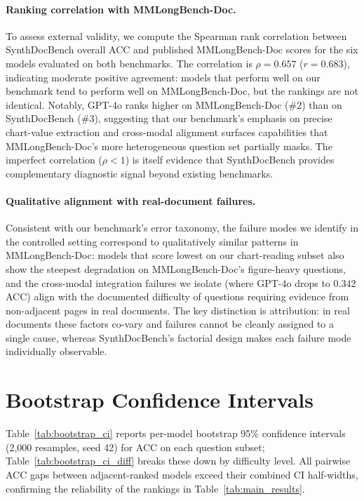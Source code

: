 \documentclass{article} %
\begin{document}
\paragraph{Ranking correlation with MMLongBench-Doc.}
To assess external validity, we compute the Spearman rank correlation between SynthDocBench overall ACC and published MMLongBench-Doc scores for the six models evaluated on both benchmarks. The correlation is $\rho = 0.657$ ($r = 0.683$), indicating moderate positive agreement: models that perform well on our benchmark tend to perform well on MMLongBench-Doc, but the rankings are not identical. Notably, GPT-4o ranks higher on MMLongBench-Doc (\#2) than on SynthDocBench (\#3), suggesting that our benchmark's emphasis on precise chart-value extraction and cross-modal alignment surfaces capabilities that MMLongBench-Doc's more heterogeneous question set partially masks. The imperfect correlation ($\rho < 1$) is itself evidence that SynthDocBench provides complementary diagnostic signal beyond existing benchmarks.

\paragraph{Qualitative alignment with real-document failures.}
Consistent with our benchmark's error taxonomy, the failure modes we identify in the controlled setting correspond to qualitatively similar patterns in MMLongBench-Doc: models that score lowest on our chart-reading subset also show the steepest degradation on MMLongBench-Doc's figure-heavy questions, and the cross-modal integration failures we isolate (where GPT-4o drops to 0.342 ACC) align with the documented difficulty of questions requiring evidence from non-adjacent pages in real documents. The key distinction is attribution: in real documents these factors co-vary and failures cannot be cleanly assigned to a single cause, whereas SynthDocBench's factorial design makes each failure mode individually observable.

\section{Bootstrap Confidence Intervals}
\label{app:bootstrap_ci}

Table~\ref{tab:bootstrap_ci} reports per-model bootstrap 95\% confidence intervals (2{,}000 resamples, seed 42) for ACC on each question subset; Table~\ref{tab:bootstrap_ci_diff} breaks these down by difficulty level. All pairwise ACC gaps between adjacent-ranked models exceed their combined CI half-widths, confirming the reliability of the rankings in Table~\ref{tab:main_results}.
\end{document}
